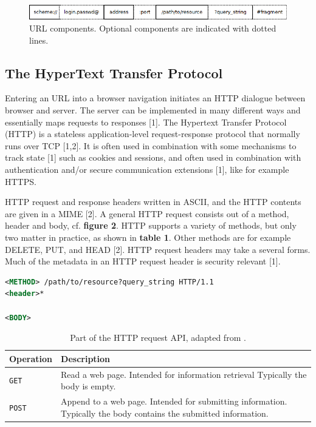 \begin{figure}[H]
	\begin{center}		
		\includegraphics[width=0.9\columnwidth]{img/security/url-components}
		\caption{URL components. Optional components are indicated with dotted lines.}
		\label{fig:url-components}
	\end{center}
\end{figure}





\subsection{The HyperText Transfer Protocol}

Entering an URL into a browser navigation initiates an HTTP dialogue between browser and server. The server can be implemented in many different ways and essentially maps requests to responses [1]. The Hypertext Transfer Protocol (HTTP) is a stateless application-level request-response protocol that normally runs over TCP [1,2]. It is often used in combination with some mechanisms to track state [1] such as cookies and sessions, and often used in combination with authentication and/or secure communication extensions [1], like for example HTTPS.

HTTP request and response headers written in ASCII, and the HTTP contents are given in a MIME [2]. A general HTTP request consists out of a method, header and body, cf. \textbf{figure 2}. HTTP supports a variety of methods, but only two matter in practice, as shown in \textbf{table 1}. Other methods are for example DELETE, PUT, and HEAD [2]. HTTP request headers may take a several forms. Much of the metadata in an HTTP request header is security relevant [1].

\begin{lstlisting}[language=xml, caption=HTTP request., label=listing:http-request]
<METHOD> /path/to/resource?query_string HTTP/1.1
<header>*

<BODY>
\end{lstlisting}


\begin{table}[H]
	\caption{Part of the HTTP request API, adapted from \cite{Tanenbaum:2002:CN:572404}.}
	\label{tab:api:collections}
	\begin{tabular}{p{150px} | p{250px}}
		\textbf{Operation} & \textbf{Description} \\
		\hline
		\texttt{GET} 	& Read a web page. Intended for information retrieval Typically the body is empty. \\
		\texttt{POST} 	& Append to a web page. Intended for submitting information. Typically the body contains the submitted information. \\
		\hline
	\end{tabular}
\end{table}


